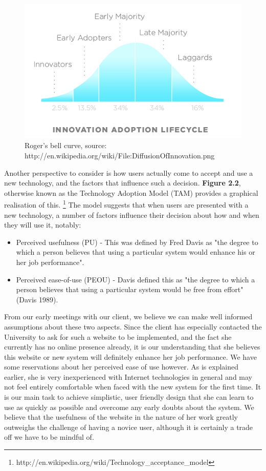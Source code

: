 \documentclass{l3proj}
\begin{document}
\begin{figure}
\begin{center}
\includegraphics[scale=0.6]{DiffusionOfInnovation}
\caption{Roger's bell curve, source: http://en.wikipedia.org/wiki/File:DiffusionOfInnovation.png}
\end{center}
\end{figure}

Another perspective to consider is how users actually come to accept and use a new technology, and the factors that influence such a decision. \textbf{Figure 2.2}, otherwise known as the Technology Adoption Model (TAM) provides a graphical realisation of this. \footnote{http://en.wikipedia.org/wiki/Technology\_acceptance\_model} The model suggests that when users are presented with a new technology, a number of factors influence their decision about how and when they will use it, notably:

\begin{itemize}
\item Perceived usefulness (PU) - This was defined by Fred Davis as "the degree to which a person believes that using a particular system would enhance his or her job performance".
\item Perceived ease-of-use (PEOU) - Davis defined this as "the degree to which a person believes that using a particular system would be free from effort" (Davis 1989).	
\end{itemize}

From our early meetings with our client, we believe we can make well informed assumptions about these two aspects. Since the client has especially contacted the University to ask for such a website to be implemented, and the fact she currently has no online presence already, it is our understanding that she believes this website or new system will definitely enhance her job performance. We have some reservations about her perceived ease of use however. As is explained earlier, she is very inexperienced with Internet technologies in general and may not feel entirely comfortable when faced with the new system for the first time. It is our main task to achieve simplistic, user friendly design that she can learn to use as quickly as possible and overcome any early doubts about the system. We believe that the usefulness of the website in the nature of her work greatly outweighs the challenge of having a novice user, although it is certainly a trade off we have to be mindful of. 
\end{document}
